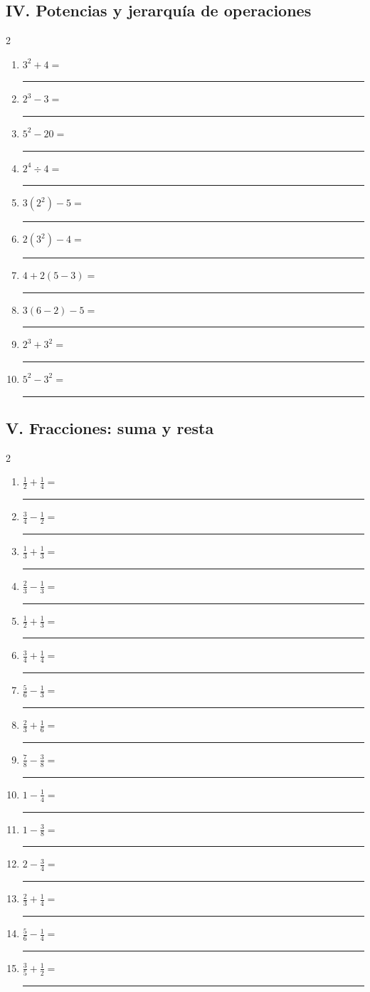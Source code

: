 \documentclass[11pt]{article}
\begin{document}
\subsection*{IV. Potencias y jerarquía de operaciones}
\begin{multicols}{2}\begin{enumerate}[leftmargin=*,start=41]
\item $\displaystyle 3^2+4=$ \rule{2.2cm}{0.4pt}
\item $\displaystyle 2^3-3=$ \rule{2.2cm}{0.4pt}
\item $\displaystyle 5^2-20=$ \rule{2.2cm}{0.4pt}
\item $\displaystyle 2^4\div4=$ \rule{2.2cm}{0.4pt}
\item $\displaystyle 3(2^2)-5=$ \rule{2.2cm}{0.4pt}
\item $\displaystyle 2(3^2)-4=$ \rule{2.2cm}{0.4pt}
\item $\displaystyle 4+2(5-3)=$ \rule{2.2cm}{0.4pt}
\item $\displaystyle 3(6-2)-5=$ \rule{2.2cm}{0.4pt}
\item $\displaystyle 2^3+3^2=$ \rule{2.2cm}{0.4pt}
\item $\displaystyle 5^2-3^2=$ \rule{2.2cm}{0.4pt}
\end{enumerate}\end{multicols}
\subsection*{V. Fracciones: suma y resta}
\begin{multicols}{2}\begin{enumerate}[leftmargin=*,start=51]
\item $\displaystyle \frac12+\frac14=$ \rule{2.2cm}{0.4pt}
\item $\displaystyle \frac34-\frac12=$ \rule{2.2cm}{0.4pt}
\item $\displaystyle \frac13+\frac13=$ \rule{2.2cm}{0.4pt}
\item $\displaystyle \frac23-\frac13=$ \rule{2.2cm}{0.4pt}
\item $\displaystyle \frac12+\frac13=$ \rule{2.2cm}{0.4pt}
\item $\displaystyle \frac34+\frac14=$ \rule{2.2cm}{0.4pt}
\item $\displaystyle \frac56-\frac13=$ \rule{2.2cm}{0.4pt}
\item $\displaystyle \frac23+\frac16=$ \rule{2.2cm}{0.4pt}
\item $\displaystyle \frac78-\frac38=$ \rule{2.2cm}{0.4pt}
\item $\displaystyle 1-\frac14=$ \rule{2.2cm}{0.4pt}
\item $\displaystyle 1-\frac38=$ \rule{2.2cm}{0.4pt}
\item $\displaystyle 2-\frac34=$ \rule{2.2cm}{0.4pt}
\item $\displaystyle \frac23+\frac14=$ \rule{2.2cm}{0.4pt}
\item $\displaystyle \frac56-\frac14=$ \rule{2.2cm}{0.4pt}
\item $\displaystyle \frac35+\frac12=$ \rule{2.2cm}{0.4pt}
\end{enumerate}\end{multicols}
\end{document}
